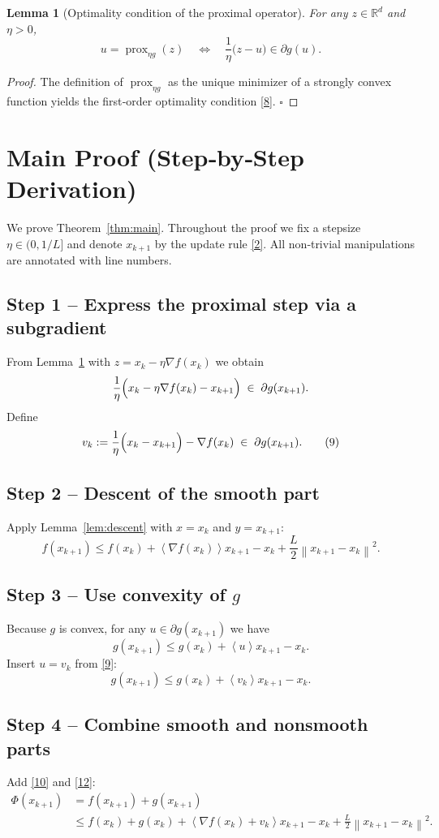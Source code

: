 \documentclass{article}
\newtheorem{lemma}{Lemma}
\newcommand{\prox}{\operatorname{prox}}
\newcommand{\R}{\mathbb{R}}
\newcommand{\norm}[1]{\left\|#1\right\|}
\newcommand{\inner}[1]{\left\langle#1\right\rangle}
\newcommand{\grad}{\nabla}
\begin{document}
\begin{lemma}[Optimality condition of the proximal operator]\label{lem:proxopt}
For any $z\in\R^{d}$ and $\eta>0$,
\[
u=\prox_{\eta g}(z)\quad\Longleftrightarrow\quad
\frac{1}{\eta}\bigl(z-u\bigr)\in\partial g(u).
\tag{8}
\]
\end{lemma}
\begin{proof}
The definition of $\prox_{\eta g}$ as the unique minimizer of a strongly convex
function yields the first‑order optimality condition \eqref{8}. \hfill $\square$
\end{proof}

\section*{Main Proof (Step‑by‑Step Derivation)}
We prove Theorem~\ref{thm:main}.  Throughout the proof we fix a stepsize
$\eta\in(0,1/L]$ and denote $x_{k+1}$ by the update rule \eqref{2}.  
All non‑trivial manipulations are annotated with line numbers.

\subsection*{Step 1 – Express the proximal step via a subgradient}
From Lemma~\ref{lem:proxopt} with $z=x_{k}-\eta\grad f(x_{k})$ we obtain
\[
\frac{1}{\eta}\Bigl(x_{k}-\eta\grad f(x_{k})-x_{k+1}\Bigr)
\;\in\;\partial g(x_{k+1}).
\]
Define
\[
v_{k}:=\frac{1}{\eta}\Bigl(x_{k}-x_{k+1}\Bigr)-\grad f(x_{k})\;\in\;\partial g(x_{k+1}).
\tag{9}
\]

\subsection*{Step 2 – Descent of the smooth part}
Apply Lemma~\ref{lem:descent} with $x=x_{k}$ and $y=x_{k+1}$:
\[
f(x_{k+1})\le f(x_{k})+\inner{\grad f(x_{k})}{x_{k+1}-x_{k}}
+\frac{L}{2}\norm{x_{k+1}-x_{k}}^{2}.
\tag{10}
\]

\subsection*{Step 3 – Use convexity of $g$}
Because $g$ is convex, for any $u\in\partial g(x_{k+1})$ we have
\[
g(x_{k+1})\le g(x_{k})+\inner{u}{x_{k+1}-x_{k}}.
\tag{11}
\]
Insert $u=v_{k}$ from \eqref{9}:
\[
g(x_{k+1})\le g(x_{k})+\inner{v_{k}}{x_{k+1}-x_{k}}.
\tag{12}
\]

\subsection*{Step 4 – Combine smooth and nonsmooth parts}
Add \eqref{10} and \eqref{12}:
\[
\begin{aligned}
\Phi(x_{k+1})
&=f(x_{k+1})+g(x_{k+1})\\[1mm]
&\le f(x_{k})+g(x_{k})
+\inner{\grad f(x_{k})+v_{k}}{x_{k+1}-x_{k}}
+\frac{L}{2}\norm{x_{k+1}-x_{k}}^{2}.
\end{aligned}
\tag{13}
\]
\end{document}
